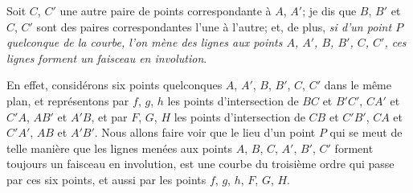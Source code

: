 \documentclass[12pt,a4paper]{article}
\begin{document}
Soit $C$, $C'$ une autre paire de points correspondante \`a $A$, $A'$; je dis que $B$, $B'$ et $C$, $C'$ sont des paires correspondantes l'une \`a l'autre; et, de plus, \textit{si d'un point $P$ quelconque de la courbe, l'on m\`ene des lignes aux points $A$, $A'$, $B$, $B'$, $C$, $C'$, ces lignes forment un faisceau en involution}.

En effet, consid\'erons six points quelconques $A$, $A'$, $B$, $B'$, $C$, $C'$ dans le m\^eme plan, et repr\'esentons par $f$, $g$, $h$ les points d'intersection de $BC$ et $B'C'$, $CA'$ et $C'A$, $AB'$ et $A'B$, et par $F$, $G$, $H$ les points d'intersection de $CB$ et $C'B'$, $CA$ et $C'A'$, $AB$ et $A'B'$. Nous allons faire voir que le lieu d'un point $P$ qui se meut de telle mani\`ere que les lignes men\'ees aux points $A$, $B$, $C$, $A'$, $B'$, $C'$ forment toujours un faisceau en involution, est une courbe du troisi\`eme ordre qui passe par ces six points, et aussi par les points $f$, $g$, $h$, $F$, $G$, $H$.

\newpage
\setcounter{page}{185}
\end{document}
